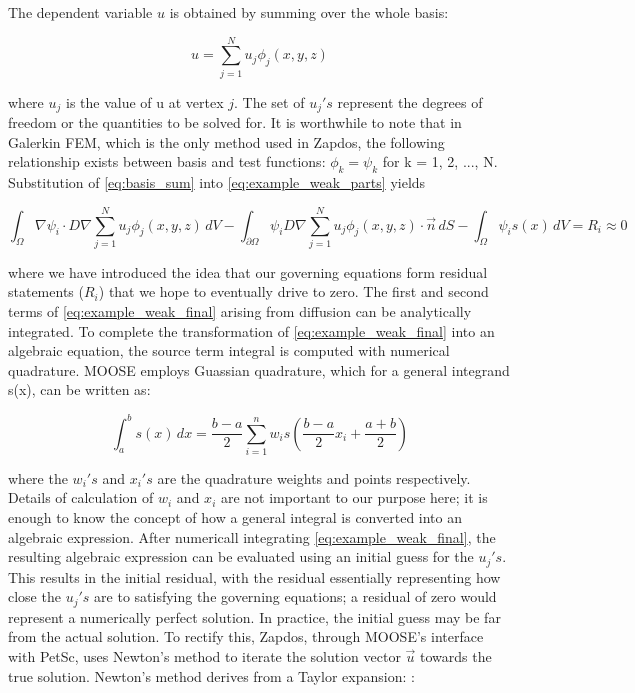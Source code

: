 The dependent variable $u$ is obtained by summing over the whole basis:

\begin{equation}
  u = \sum_{j=1}^Nu_j\phi_j(x,y,z)
  \label{eq:basis_sum}
\end{equation}

where $u_j$ is the value of u at vertex $j$. The set of $u_j's$ represent the degrees of freedom or the quantities to be solved for. It is worthwhile to note that in Galerkin FEM, which is the only method used in Zapdos, the following relationship exists between basis and test functions: $\phi_k=\psi_k$ for k = 1, 2, ..., N. Substitution of \cref{eq:basis_sum} into \cref{eq:example_weak_parts} yields

\begin{equation}
  \int_{\Omega}\nabla\psi_i\cdot D\nabla \sum_{j=1}^Nu_j\phi_j(x,y,z)\,dV - \int_{\partial\Omega}\psi_iD\nabla \sum_{j=1}^Nu_j\phi_j(x,y,z) \cdot \vec{n}\,dS -\int_{\Omega}\psi_is(x)\,dV = R_i \approx 0
  \label{eq:example_weak_final}
\end{equation}

where we have introduced the idea that our governing equations form residual statements ($R_i$) that we hope to eventually drive to zero. The first and second terms of \cref{eq:example_weak_final} arising from diffusion can be analytically integrated. To complete the transformation of \cref{eq:example_weak_final} into an algebraic equation, the source term integral is computed with numerical quadrature. MOOSE employs Guassian quadrature, which for a general integrand s(x), can be written as:

\begin{equation}
  \int_a^bs(x)\,dx = \frac{b-a}{2}\sum_{i=1}^nw_is\left(\frac{b-a}{2}x_i+\frac{a+b}{2}\right)
  \label{eq:quad}
\end{equation}

where the $w_i's$ and $x_i's$ are the quadrature weights and points respectively. Details of calculation of $w_i$ and $x_i$ are not important to our purpose here; it is enough to know the concept of how a general integral is converted into an algebraic expression. After numericall integrating \cref{eq:example_weak_final}, the resulting algebraic expression can be evaluated using an initial guess for the $u_j's$. This results in the initial residual, with the residual essentially representing how close the $u_j's$ are to satisfying the governing equations; a residual of zero would represent a numerically perfect solution. In practice, the initial guess may be far from the actual solution. To rectify this, Zapdos, through MOOSE's interface with PetSc, uses Newton's method to iterate the solution vector $\vec{u}$ towards the true solution. Newton's method derives from a Taylor expansion: \cite{knoll2004jacobian}:

